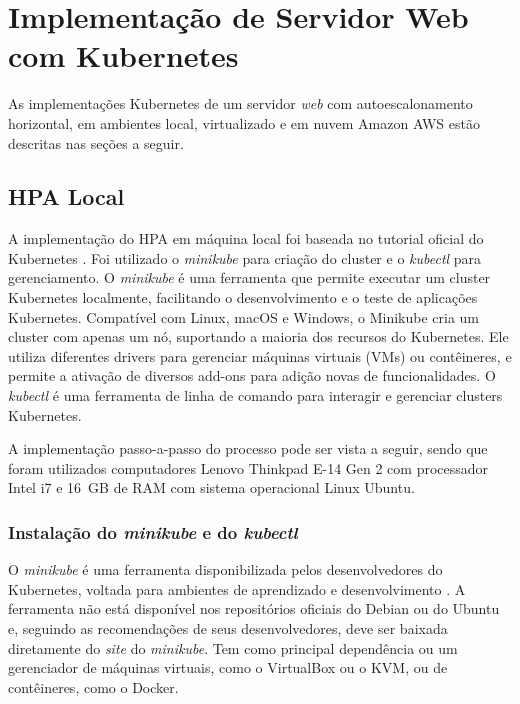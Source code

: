\documentclass[12pt]{article}
\begin{document}


\section{Implementação de Servidor Web com Kubernetes}\label{sec:impl-serv-web}

As implementações Kubernetes de um servidor \textit{web} com autoescalonamento horizontal, em ambientes local, virtualizado e em nuvem Amazon AWS estão descritas nas seções a seguir.

\subsection{HPA Local}

A implementação do HPA em máquina local foi baseada no tutorial oficial do Kubernetes  \cite{kubernetes_horizontalpodautoscaler_nodate}. Foi utilizado o \textit{minikube} para criação do cluster e o \textit{kubectl} para gerenciamento. O \textit{minikube} é uma ferramenta que permite executar um cluster Kubernetes localmente, facilitando o desenvolvimento e o teste de aplicações Kubernetes. Compatível com Linux, macOS e Windows, o Minikube cria um cluster com apenas um nó, suportando a maioria dos recursos do Kubernetes. Ele utiliza diferentes drivers para gerenciar máquinas virtuais (VMs) ou contêineres, e permite a ativação de diversos add-ons para adição novas de funcionalidades. O \textit{kubectl} é uma ferramenta de linha de comando para interagir e gerenciar clusters Kubernetes. 

A implementação passo-a-passo do processo pode ser vista a seguir, sendo que foram utilizados computadores Lenovo Thinkpad E-14 Gen 2 com processador Intel i7 e 16~GB de RAM com sistema operacional Linux Ubuntu.

\subsubsection{Instalação do \textit{minikube} e do \textit{kubectl}}

O \textit{minikube} é uma ferramenta disponibilizada pelos desenvolvedores do Kubernetes, voltada para ambientes de aprendizado e desenvolvimento \cite{minikubeMinikubeStart_2024}. A ferramenta não está disponível nos repositórios oficiais do Debian ou do Ubuntu e, seguindo as recomendações de seus desenvolvedores, deve ser baixada diretamente do \textit{site} do \textit{minikube}. Tem como principal dependência ou um gerenciador de máquinas virtuais, como o VirtualBox ou o KVM, ou de contêineres, como o Docker.
\end{document}
